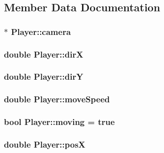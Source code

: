 \subsection{Member Data Documentation}
\hypertarget{classPlayer_a91d4e9d955f3df0600c2f1504771f5be}{
\subsubsection[{camera}]{$\ast$ Player\-::camera}}\label{classPlayer_a91d4e9d955f3df0600c2f1504771f5be}
\hypertarget{classPlayer_a70c1e9d775acdb0de11c2d03a4d3bdf2}{
\subsubsection[{dir\-X}]{\setlength{\rightskip}{0pt plus 5cm}double Player\-::dir\-X}}\label{classPlayer_a70c1e9d775acdb0de11c2d03a4d3bdf2}
\hypertarget{classPlayer_a20d72dcab9c6d4380fab2f1f5df549ae}{
\subsubsection[{dir\-Y}]{\setlength{\rightskip}{0pt plus 5cm}double Player\-::dir\-Y}}\label{classPlayer_a20d72dcab9c6d4380fab2f1f5df549ae}
\hypertarget{classPlayer_ad05e8e79181516d5edf65eca5d52d4df}{
\subsubsection[{move\-Speed}]{\setlength{\rightskip}{0pt plus 5cm}double Player\-::move\-Speed}}\label{classPlayer_ad05e8e79181516d5edf65eca5d52d4df}
\hypertarget{classPlayer_aaf48c4184bee665e1f7f625dedc25adf}{
\subsubsection[{moving}]{\setlength{\rightskip}{0pt plus 5cm}bool Player\-::moving = true}}\label{classPlayer_aaf48c4184bee665e1f7f625dedc25adf}
\hypertarget{classPlayer_a1c39a22c1f41f7bcc351fcfb5598d823}{
\subsubsection[{pos\-X}]{\setlength{\rightskip}{0pt plus 5cm}double Player\-::pos\-X}}\label{classPlayer_a1c39a22c1f41f7bcc351fcfb5598d823}
